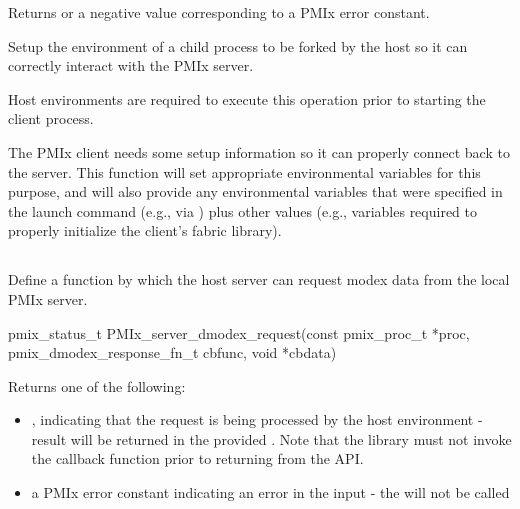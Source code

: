 \begin{arglist}
\end{arglist}

Returns  or a negative value corresponding to a PMIx error constant.

\descr

Setup the environment of a child process to be forked by the host so it can correctly interact with the PMIx server.

\advicermstart
Host environments are required to execute this operation prior to starting the client process.
\advicermend

The \ac{PMIx} client needs some setup information so it can properly connect back to the server.
This function will set appropriate environmental variables for this purpose, and will also provide any environmental variables that were specified in the launch command (e.g., via ) plus other values (e.g., variables required to properly initialize the client's fabric library).


\subsection{}

\summary

Define a function by which the host server can request modex data from the local PMIx server.

\format

\cspecificstart
\begin{codepar}
pmix_status_t PMIx_server_dmodex_request(const pmix_proc_t *proc,
                        pmix_dmodex_response_fn_t cbfunc,
                        void *cbdata)
\end{codepar}
\cspecificend

\begin{arglist}
\end{arglist}

Returns one of the following:

\begin{itemize}
    \item {}, indicating that the request is being processed by the host environment - result will be returned in the provided . Note that the library must not invoke the callback function prior to returning from the \ac{API}.
    \item a PMIx error constant indicating an error in the input - the  will not be called
\end{itemize}


